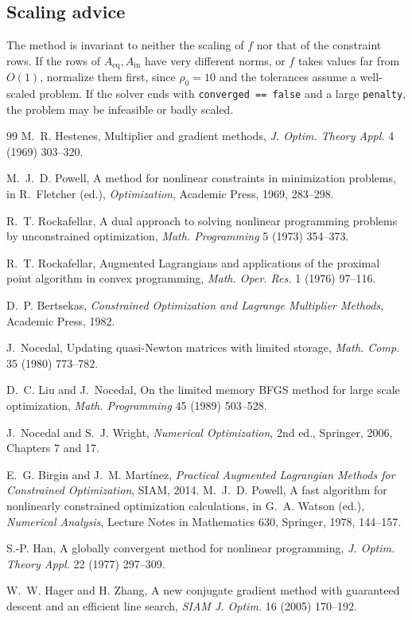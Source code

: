 \documentclass[11pt,a4paper]{article}
\newcommand{\Aeq}{A_{\mathrm{eq}}}
\newcommand{\Ain}{A_{\mathrm{in}}}
\begin{document}
\subsection{Scaling advice}
The method is invariant to neither the scaling of $f$ nor that of the
constraint rows. If the rows of $\Aeq,\Ain$ have very different norms, or $f$
takes values far from $O(1)$, normalize them first, since $\rho_0=10$ and
the tolerances assume a well-scaled problem. If the solver ends with
\texttt{converged == false} and a large \texttt{penalty}, the problem may be
infeasible or badly scaled.

\begin{thebibliography}{99}
M.~R. Hestenes, Multiplier and gradient methods,
\emph{J. Optim. Theory Appl.} 4 (1969) 303--320.

M.~J.~D. Powell, A method for nonlinear constraints in minimization problems,
in R.~Fletcher (ed.), \emph{Optimization}, Academic Press, 1969, 283--298.

R.~T. Rockafellar, A dual approach to solving nonlinear programming problems by
unconstrained optimization, \emph{Math. Programming} 5 (1973) 354--373.

R.~T. Rockafellar, Augmented Lagrangians and applications of the proximal point
algorithm in convex programming, \emph{Math. Oper. Res.} 1 (1976) 97--116.

D.~P. Bertsekas, \emph{Constrained Optimization and Lagrange Multiplier Methods},
Academic Press, 1982.

J.~Nocedal, Updating quasi-Newton matrices with limited storage,
\emph{Math. Comp.} 35 (1980) 773--782.

D.~C. Liu and J.~Nocedal, On the limited memory BFGS method for large scale
optimization, \emph{Math. Programming} 45 (1989) 503--528.

J.~Nocedal and S.~J. Wright, \emph{Numerical Optimization}, 2nd ed., Springer,
2006, Chapters 7 and 17.

E.~G. Birgin and J.~M. Mart\'inez, \emph{Practical Augmented Lagrangian Methods
for Constrained Optimization}, SIAM, 2014.
M.~J.~D. Powell, A fast algorithm for nonlinearly constrained optimization
calculations, in G.~A. Watson (ed.), \emph{Numerical Analysis}, Lecture Notes in
Mathematics 630, Springer, 1978, 144--157.

S.-P. Han, A globally convergent method for nonlinear programming,
\emph{J. Optim. Theory Appl.} 22 (1977) 297--309.

W.~W. Hager and H. Zhang, A new conjugate gradient method with guaranteed
descent and an efficient line search, \emph{SIAM J. Optim.} 16 (2005) 170--192.
\end{thebibliography}
\end{document}
